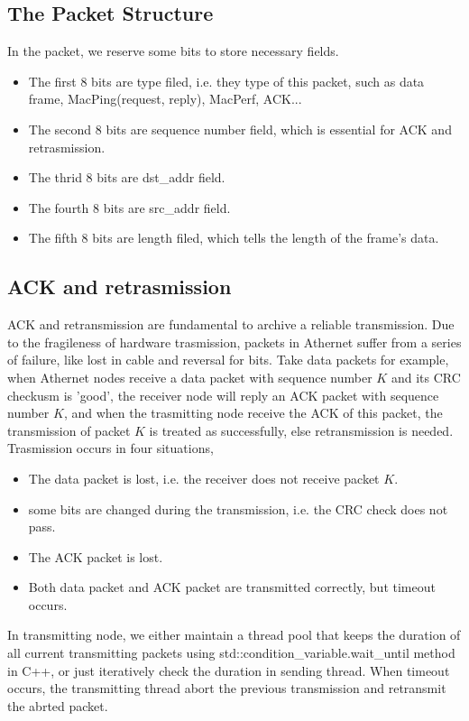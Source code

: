 \documentclass[11pt, conference]{IEEEtran}
\begin{document}
\subsection{The Packet Structure}

In the packet, we reserve some bits to store necessary fields.
\begin{itemize}
\item The first 8 bits are type filed, i.e. they type of this packet, such as data frame, MacPing(request, reply), MacPerf, ACK...
\item The second 8 bits are sequence number field, which is essential for ACK and retrasmission.
\item The thrid 8 bits are dst\_addr field. 
\item The fourth 8 bits are src\_addr field.
\item The fifth 8 bits are length filed, which tells the length of the frame's data.
\end{itemize}

\subsection{ACK and retrasmission}

ACK and retransmission are fundamental to archive a reliable transmission. Due to the fragileness of hardware trasmission, packets in 
Athernet suffer from a series of failure, like lost in cable and reversal for bits. Take data packets for example, when Athernet nodes receive
a data packet with sequence number $K$ and its CRC checkusm is 'good', the receiver node will reply an ACK packet with sequence number $K$, and when the
trasmitting node receive the ACK of this packet, the transmission of packet $K$ is treated as successfully, else retransmission is needed. Trasmission occurs
in four situations,
\begin {itemize}
\item The data packet is lost, i.e. the receiver does not receive packet $K$.
\item some bits are changed during the transmission, i.e. the CRC check does not pass.
\item The ACK packet is lost.
\item Both data packet and ACK packet are transmitted correctly, but timeout occurs.
\end {itemize}
In transmitting node, we either maintain a thread pool that keeps the duration of all current transmitting packets using std::condition\_variable.wait\_until method
in C++, or just iteratively check the duration in sending thread. When timeout occurs, the transmitting thread abort the previous transmission and retransmit the abrted packet.
\end{document}
